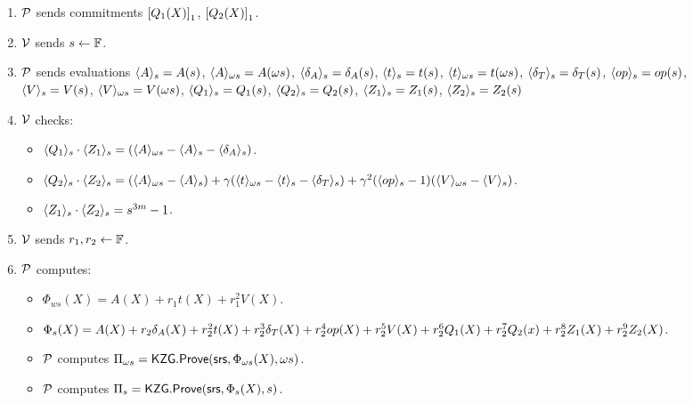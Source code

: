 \begin{figure}[htbp]
\begin{mdframed}
{\begin{enumerate}[leftmargin=1em, label=\arabic*]
            \item $\prover$ sends commitments $\gone{Q_1(X)}$, $\gone{Q_2(X)}$.
            \item $\verifier$ sends $s\gets\F$.
            \item $\prover$ sends evaluations $\val{s}{A}=A(s)$, $\val{\omega s}{A}=A(\omega s)$, $\val{s}{\delta_A} = \delta_A(s)$, $\val{s}{t}=t(s)$, $\val{\omega s}{t}=t(\omega s)$, $\val{s}{\delta_T} = \delta_T(s)$, $\val{s}{\op}=\op(s)$, $\val{s}{V}=V(s)$, $\val{\omega s}{V}=V(\omega s)$, $\val{s}{Q_1}=Q_1(s)$, $\val{s}{Q_2}=Q_2(s)$, $\val{s}{Z_1}=Z_1(s)$, $\val{s}{Z_2}=Z_2(s)$
            \item $\verifier$ checks:
            \begin{itemize}
                \item $\val{s}{Q_1}\cdot \val{s}{Z_1} = (\val{\omega s}{A} - \val{s}{A} - \val{s}{\delta_A})$.
                \item  $\val{s}{Q_2}\cdot \val{s}{Z_2} = (\val{\omega s}{A} - \val{s}{A})+\gamma (\val{\omega s}{t} - \val{s}{t} - \val{s}{\delta_T})+\gamma^2 (\val{s}{\op}-1)(\val{\omega s}{V} - \val{s}{V}) $.
                \item $\val{s}{Z_1} \cdot \val{s}{Z_2}=s^{3m}-1$.
            \end{itemize}
            \item $\verifier$ sends $r_1, r_2\gets\F$.
            \item $\prover$ computes:
            \begin{itemize}
                \item $\Phi_{ws}(X)= A(X)+r_1 t(X) +r_1^2 V(X)$.
                \item $\Phi_s(X)=A(X)+r_2 \delta_A(X)+r_2^2 t(X)+ r_2^3 \delta_T(X)+r_2^4 \op(X) +r_2^5 V(X)+r_2^6 Q_1(X)+ r_2^7 Q_2(x)+r_2^8 Z_1(X)+r_2^9 Z_2(X)$.
                \item $\prover$ computes $\Pi_{\omega s} = \KZGopen(\srs, \Phi_{\omega s}(X), \omega s)$.
                \item $\prover$ computes $\Pi_{s} = \KZGopen(\srs, \Phi_{s}(X),s)$.


\end{itemize}
\end{enumerate}}
\end{mdframed}
\end{figure}
